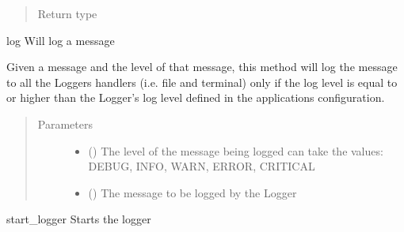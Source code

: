 \documentclass[letterpaper,10pt,english]{sphinxmanual}
\begin{document}
\begin{fulllineitems}
\begin{fulllineitems}
\begin{quote}
\begin{description}
\item[{Return type}] \leavevmode
{}

\end{description}\end{quote}

\end{fulllineitems}


\begin{fulllineitems}
\label{\detokenize{index:config.config_manager.Logger.log}}
log Will log a message

Given a message and the level of that message, this
method will log the message to all the Loggers handlers
(i.e. file and terminal) only if the log level is equal
to or higher than the Logger’s log level defined in the
applications configuration.
\begin{quote}\begin{description}
\item[{Parameters}] \leavevmode\begin{itemize}
\item {} 
 () \textendash{} The level of the message being logged can take the values: DEBUG, INFO, WARN, ERROR, CRITICAL

\item {} 
 () \textendash{} The message to be logged by the Logger

\end{itemize}

\end{description}\end{quote}

\end{fulllineitems}


\begin{fulllineitems}
\label{\detokenize{index:config.config_manager.Logger.start_logger}}
start\_logger Starts the logger


\end{fulllineitems}
\end{fulllineitems}
\end{document}
